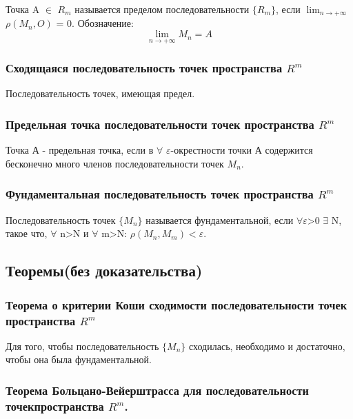 \documentclass[a4paper, 12pt]{article}
\renewcommand{\epsilon}{\varepsilon}
\newcommand{\Rm}{\texorpdfstring{$R^m$}{Lg}}
\def\newline{}%
\begin{document}
            Точка A $\in$ $R_m$ называется пределом последовательности $\{R_m\}$, если
            $\displaystyle{\lim_{n \to +\infty}}$ $\rho(M_n, O)$ = 0.\newline
            Обозначение: \[\displaystyle{\lim_{n \to +\infty}} M_n = A\]

            \subsubsection{Сходящаяся последовательность точек пространства \Rm}

            Последовательность точек, имеющая предел.

            \subsubsection{Предельная точка последовательности точек пространства \Rm}

            Точка А - предельная точка, если в $\forall$ $\epsilon$-окрестности точки А
            содержится бесконечно много членов последовательности точек $M_n$.

            \subsubsection{Фундаментальная последовательность точек пространства \Rm}

            Последовательность точек $\{M_n\}$ называется фундаментальной, если\newline
            $\forall \epsilon$>0 $\exists$ N, такое что, $\forall$ n>N и $\forall$ m>N:
            $\rho(M_n, M_m) < \epsilon$.
        \subsection{Теоремы(без доказательства)}
            \subsubsection{Теорема о критерии Коши сходимости последовательности точек пространства \Rm}

            Для того, чтобы последовательность $\{M_n\}$ сходилась,
            необходимо и достаточно, чтобы она была фундаментальной.

            \subsubsection{Теорема Больцано-Вейерштрасса для последовательности точек\newline пространства \Rm.}
\end{document}

